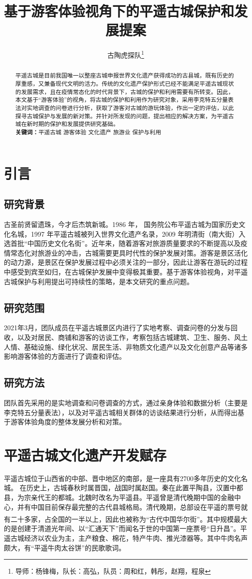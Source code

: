 \documentclass[UTF8]{ctexart}
\title{基于游客体验视角下的平遥古城保护和发展提案}
\author{古陶虎探队\footnote{导师：杨锋梅，队长：高弘，队员：周和红，韩彤，赵翔，程泉}}
\date{}
\newcommand{\upcite}[1]{\textsuperscript{\textsuperscript{\cite{#1}}}}
\begin{document}
\maketitle
\tableofcontents
\begin{abstract}
    平遥古城是目前我国唯一以整座古城申报世界文化遗产获得成功的古县城，既有历史的厚重感，又兼备现代文明的活力。传统的文化遗产保护形式已经不能满足平遥古城现状的发展需求，且在疫情常态化的时代背景下，古城的保护和利用需要有所转变。因此，本文基于“游客体验”的视角，将古城的保护和利用作为研究对象，采用李克特五分量表法对实地调查的问卷进行分析，获取了游客对古城的游玩体验，作出一定的评估，以此探寻古城保护与发展的新对策。并针对所发现的问题，提出相应的解决方案，为平遥古城在新时期的保护和发展提供研究基础。\\
    \textbf{关键词：}平遥古城 \quad 游客体验 \quad 文化遗产 \quad 旅游业 \quad 保护与利用
\end{abstract}
\section{引言}
    \subsection{研究背景}
    古圣前贤留遗珠，今才后杰筑新城。1986 年， 国务院公布平遥古城为国家历史文化名城，1997 年平遥古城被列入世界文化遗产名录，2009 年明清街（南大街）入选首批“中国历史文化名街”。近年来，随着游客对旅游质量要求的不断提高以及疫情常态化对旅游业的冲击，古城需要更具时代性的保护发展对策。游客是景区活化的动力源，是景区在保护发展过程中必须关注的一部分，因此让游客在游玩的过程中感受到宾至如归，在古城保护发展中变得极其重要。基于游客体验视角，对平遥古城保护与利用提出可持续性的策略，是本文研究的重点问题。
    \subsection{研究范围}
    2021年3月，团队成员在平遥古城景区内进行了实地考察、调查问卷的分发与回收，以及对居民、商铺和游客的访谈工作，考察包括古城建筑、卫生、服务、风土人情、基础设施、绿化状况、居民生活、非物质文化遗产以及文化创意产品等诸多影响游客体验的方面进行了调查和评估。
    \subsection{研究方法}
    团队首先采用的是实地调查和问卷调查的方式，通过亲身体验和数据分析（主要是李克特五分量表法），以及对平遥古城相关群体的访谈结果进行分析，从而得出基于游客体验角度的整体发展分析和对策。
\section{平遥古城文化遗产开发赋存}
平遥古城位于山西省的中部、晋中地区的南部，是一座具有2700多年历史的文化名城。 在历史上，古城春秋时属晋国，战国时属赵国。秦在此置平陶县，汉置中都县，为宗亲代王的都城。北魏时改名为平遥县。平遥曾是清代晚期中国的金融中心，并有中国目前保存最完整的古代县城格局。清代晚期，总部设在平遥的票号就有二十多家，占全国的一半以上，因此也被称为“古代中国华尔街”\upcite{秦晋2012平遥以中国}。其中规模最大的是创建于清道光年间、以“汇通天下”而闻名于世的中国第一座票号“日升昌”。平遥古城经济以农业为主，主产粮食、棉花，特产牛肉、推光漆器等。其中牛肉名声颇大，有“平遥牛肉太谷饼”的民歌歌词。
\end{document}
